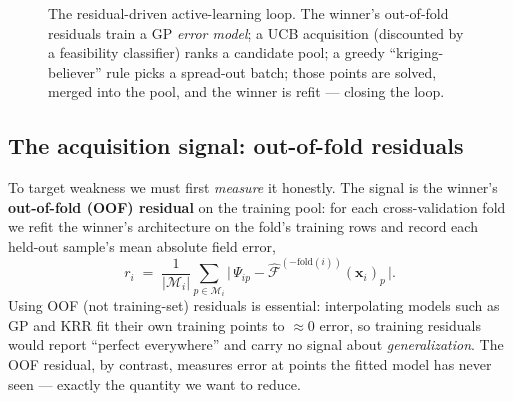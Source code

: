 \documentclass[11pt]{article}
\newcommand{\bx}{\mathbf{x}}
\newcommand{\Fhat}{\hat{\mathcal{F}}}
\begin{document}
\begin{figure}[h]
\centering
{}
\caption{The residual-driven active-learning loop. The winner's out-of-fold residuals train a GP
\emph{error model}; a UCB acquisition (discounted by a feasibility classifier) ranks a candidate
pool; a greedy ``kriging-believer'' rule picks a spread-out batch; those points are solved,
merged into the pool, and the winner is refit --- closing the loop.}
\label{fig:active}
\end{figure}

\subsection{The acquisition signal: out-of-fold residuals}
To target weakness we must first \emph{measure} it honestly. The signal is the winner's
\textbf{out-of-fold (OOF) residual} on the training pool: for each cross-validation fold we refit
the winner's architecture on the fold's training rows and record each held-out sample's mean
absolute field error,
\begin{equation}
r_i \;=\; \frac{1}{|\mathcal{M}_i|}\sum_{p\in\mathcal{M}_i}\big|\,\Psi_{ip}-\Fhat^{(-\text{fold}(i))}(\bx_i)_p\,\big| .
\end{equation}
Using OOF (not training-set) residuals is essential: interpolating models such as GP and KRR fit
their own training points to $\approx0$ error, so training residuals would report ``perfect
everywhere'' and carry no signal about \emph{generalization}. The OOF residual, by contrast,
measures error at points the fitted model has never seen --- exactly the quantity we want to reduce.
\end{document}
